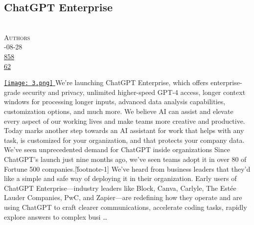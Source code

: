 \documentclass[10pt,a4paper]{article}
\begin{document}
\subsection{ChatGPT Enterprise}
\noindent\begin{minipage}[t]{0.19\linewidth}
\vspace{0pt}
\noindent\scshape\footnotesize
\\ {\scriptsize\faUser}\space 
Authors
\\ {\scriptsize\faCalendar}-08-28
\\ {\scriptsize\faThumbsOUp}\space 
\href{http://news.ycombinator.com/item?id=37297304\&utm\_term=comment}{858} 
\\ {\scriptsize\faComments}\space 
\href{http://news.ycombinator.com/item?id=37297304\&utm\_term=comment}{62} 
\end{minipage} 
\begin{minipage}[t]{0.80\linewidth}
\vspace{0pt}
\begin{multicols}{2}
    \href{https://openai.com/blog/introducing-chatgpt-enterprise?utm\_source=hackernewsletter\&utm\_medium=email\&utm\_term=fav}{
        \texttt{[image: 3.png]}
    }
We’re launching ChatGPT Enterprise, which offers enterprise-grade security and privacy, unlimited higher-speed GPT-4 access, longer context windows for processing longer inputs, advanced data analysis capabilities, customization options, and much more. We believe AI can assist and elevate every aspect of our working lives and make teams more creative and productive. Today marks another step towards an AI assistant for work that helps with any task, is customized for your organization, and that protects your company data.
We’ve seen unprecedented demand for ChatGPT inside organizations
Since ChatGPT's launch just nine months ago, we’ve seen teams adopt it in over 80 of Fortune 500 companies.[\^footnote-1] We've heard from business leaders that they’d like a simple and safe way of deploying it in their organization. Early users of ChatGPT Enterprise—industry leaders like Block, Canva, Carlyle, The Estée Lauder Companies, PwC, and Zapier—are redefining how they operate and are using ChatGPT to craft clearer communications, accelerate coding tasks, rapidly explore answers to complex busi
\dots
\end{multicols}
\end{minipage}
\par\medskip
\end{document}
